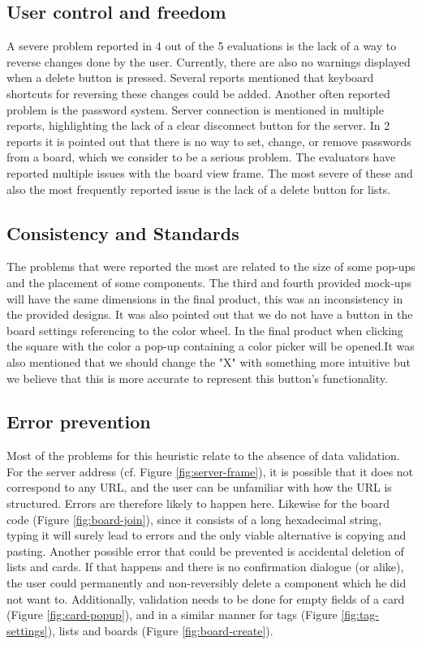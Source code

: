 \subsection{User control and freedom}
A severe problem reported in 4 out of the 5 evaluations is the lack of a way to reverse changes done by the user. Currently, there are also no warnings displayed when a delete button is pressed. Several reports mentioned that keyboard shortcuts for reversing these changes could be added. Another often reported problem is the password system. Server connection is mentioned in multiple reports, highlighting the lack of a clear disconnect button for the server. In 2 reports it is pointed out that there is no way to set, change, or remove passwords from a board, which we consider to be a serious problem. The evaluators have reported multiple issues with the board view frame. The most severe of these and also the most frequently reported issue is the lack of a delete button for lists. 

\subsection{Consistency and Standards}
The problems that were reported the most are related to the size of some pop-ups and the placement of some components. The third and fourth provided mock-ups will have the same dimensions in the final product, this was an inconsistency in the provided designs. It was also pointed out that we do not have a button in the board settings referencing to the color wheel. In the final product when clicking the square with the color a pop-up containing a color picker will be opened.It was also mentioned that we should change the "X" with something more intuitive but we believe that this is more accurate to represent this button's functionality.

\subsection{Error prevention}

Most of the problems for this heuristic relate to the absence of data validation. For the server address (cf. Figure \ref{fig:server-frame}), it is possible that it does not correspond to any URL, and the user can be unfamiliar with how the URL is structured. Errors are therefore likely to happen here. Likewise for the board code (Figure \ref{fig:board-join}), since it consists of a long hexadecimal string, typing it will surely lead to errors and the only viable alternative is copying and pasting. Another possible error that could be prevented is accidental deletion of lists and cards. If that happens and there is no confirmation dialogue (or alike), the user could permanently and non-reversibly delete a component which he did not want to. Additionally, validation needs to be done for empty fields of a card (Figure \ref{fig:card-popup}), and in a similar manner for tags (Figure \ref{fig:tag-settings}), lists and boards (Figure \ref{fig:board-create}).

